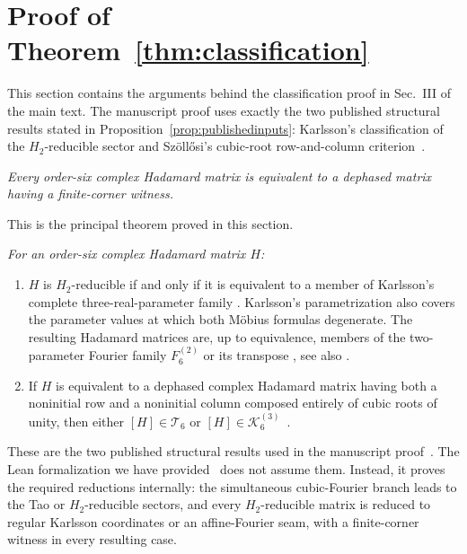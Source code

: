 \documentclass[aps,prx,reprint,nofootinbib,twoside,superscriptaddress,longbibliography,floatfix]{revtex4-2}
\theoremstyle{definition}
\newcommand{\KK}{\mathcal K}
\begin{document}
\setcounter{tocdepth}{3}
\supplementaltableofcontents
\clearpage

\section{{Proof of Theorem~\ref{thm:classification}}}
\label{sec:supp-classification-proof}

{This section contains the arguments behind the classification proof in Sec.~III of the main text. The manuscript proof uses exactly the two published structural results stated in Proposition~\ref{prop:publishedinputs}: Karlsson's classification of the $H_2$-reducible sector and Sz\"oll\H{o}si's cubic-root row-and-column criterion~\cite{Karlsson2011H2,Karlsson2011ThreeParameter,Szollosi2012FourParameter}.}

{\emph{Every order-six complex Hadamard matrix is equivalent to a dephased matrix having a finite-corner witness.}}

{This is the principal theorem proved in this section.}

{\emph{For an order-six complex Hadamard matrix $H$:}}
\begin{enumerate}
\item {$H$ is $H_2$-reducible if and only if it is equivalent to a member of Karlsson's complete three-real-parameter family \cite{Karlsson2011H2,Karlsson2011ThreeParameter}. 
Karlsson's parametrization also covers the parameter values at which both
M\"obius formulas degenerate. The resulting Hadamard matrices are, up to equivalence, members of the two-parameter Fourier family $F_6^{(2)}$ or its transpose \cite[Secs.~4--5 and Theorem~11]{Karlsson2011ThreeParameter}, see also \cite[p.~623, Theorem~2.11]{Szollosi2012FourParameter}.}
\item {If $H$ is equivalent to a dephased complex Hadamard matrix having both a noninitial row and a noninitial column composed entirely of cubic roots of unity, then either $[H] \in \mathcal T_6$ or $[H]\in\KK_6^{(3)}$~\cite[p.~624, Lemma~2.14]{Szollosi2012FourParameter}.}
\end{enumerate}
{These are the two published structural results used in the manuscript proof~\cite{Karlsson2011H2,Karlsson2011ThreeParameter,Szollosi2012FourParameter}. The Lean formalization we have provided~\cite{CardenesWuttig2026HadamardRepository} does not assume them. Instead, it proves the required reductions internally: the simultaneous cubic-Fourier branch leads to the Tao or $H_2$-reducible sectors, and every $H_2$-reducible matrix is reduced to regular Karlsson coordinates or an affine-Fourier seam, with a finite-corner witness in every resulting case.}
\end{document}
